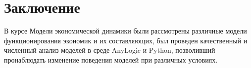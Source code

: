 \section*{Заключение}

В курсе Модели экономической динамики были рассмотрены различные модели функционирования экономик и их составляющих, был проведен качественный и численный анализ моделей в среде AnyLogic и Python, позволивший пронаблюдать изменение поведения моделей при различных условиях.